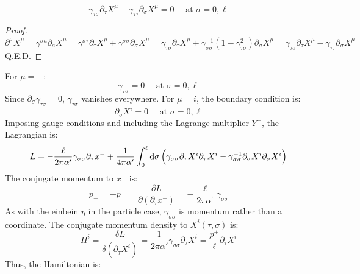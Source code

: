 \begin{equation}
	\gamma_{\tau \sigma} \partial_{\tau} X^{\mu}-\gamma_{\tau \tau} \partial_{\sigma} X^{\mu}=0 \quad \text { at } \sigma=0, \ell
\end{equation}
\begin{proof}
	$
	\partial^{\sigma} X^{\mu} =\gamma^{\sigma a} \partial_{a} X^{\mu}=\gamma^{\sigma \tau} \partial_{\tau} X^{\mu}+\gamma^{\sigma \sigma} \partial_{\sigma} X^{\mu} =\gamma_{\tau \sigma} \partial_{\tau} X^{\mu}+\gamma_{\sigma \sigma}^{-1}\left(1-\gamma_{\tau \sigma}^{2}\right) \partial_{\sigma} X^{\mu} =\gamma_{\tau \sigma} \partial_{\tau} X^{\mu}-\gamma_{\tau \tau} \partial_{\sigma} X^{\mu}
	$
	Q.E.D. 
\end{proof}
\noindent For $\mu=+$: 
\begin{equation}
	\gamma_{\tau \sigma}=0 \quad \text { at } \sigma=0, \ell
\end{equation}
Since $\partial_\sigma \gamma_{\tau\sigma}=0$, $\gamma_{\tau\sigma}$ vanishes everywhere. 
For $\mu=i$, the boundary condition is: 
\begin{equation}
	\partial_{\sigma} X^{i}=0 \quad \text { at } \sigma=0, \ell   \label{bound-mu-i}
\end{equation}
Imposing gauge conditions and including the Lagrange multiplier $Y^-$, the Lagrangian is: 
\begin{equation}
	L=-\frac{\ell}{2 \pi \alpha^{\prime}} \gamma_{\sigma \sigma} \partial_{\tau} x^{-}+\frac{1}{4 \pi \alpha^{\prime}} \int_{0}^{\ell} \mathrm{d}\sigma\,\Bigl(\gamma_{\sigma \sigma} \partial_{\tau} X^{i} \partial_{\tau} X^{i}-\gamma_{\sigma \sigma}^{-1} \partial_{\sigma} X^{i} \partial_{\sigma} X^{i}\Bigr)
\end{equation}
The conjugate momentum to $x^-$ is: 
\begin{equation}
	p_{-}=-p^{+}=\frac{\partial L}{\partial\left(\partial_{\tau} x^{-}\right)}=-\frac{\ell}{2 \pi \alpha^{\prime}} \gamma_{\sigma \sigma}\label{1.3.17}
\end{equation}
As with the einbein $\eta$ in the particle case, $\gamma_{\sigma\sigma}$ is momentum rather than a coordinate. 
The conjugate momentum density to $X^i(\tau, \sigma)$ is: 
\begin{equation}
	\Pi^{i}=\frac{\delta L}{\delta\left(\partial_{\tau} X^{i}\right)}=\frac{1}{2 \pi \alpha'} \gamma_{\sigma \sigma} \partial_{\tau} X^{i}=\frac{p^{+}}{\ell} \partial_{\tau} X^{i} \label{1.3.18}
\end{equation}
Thus, the Hamiltonian is: 
